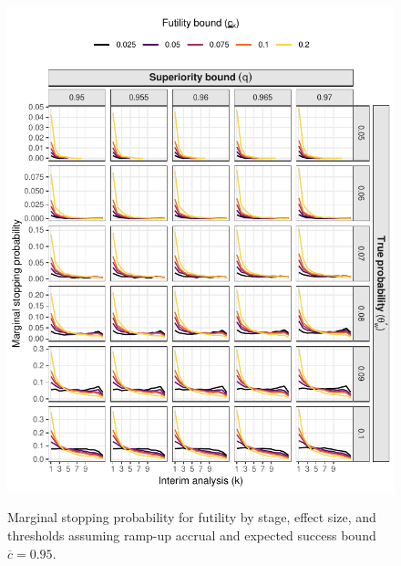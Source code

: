 \documentclass{article}
\begin{document}
\begin{figure}[!ht]
	\caption{Marginal stopping probability for futility by stage, effect size, and thresholds assuming ramp-up accrual and expected success bound $\overline{c}=0.95$.}
	\includegraphics{stop_futility_5.pdf}
	\label{fig:stop_futility_rampup}
\end{figure}
\end{document}
